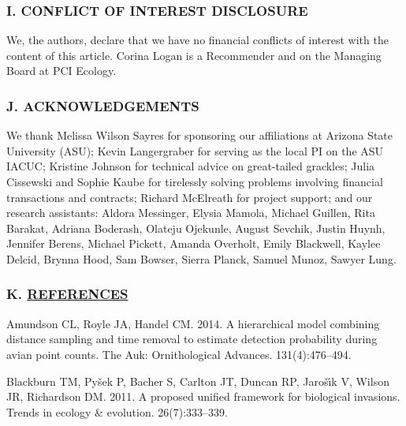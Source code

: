 \documentclass[
]{article}
\begin{document}
\hypertarget{i.-conflict-of-interest-disclosure}{%
\subsubsection{I. CONFLICT OF INTEREST
DISCLOSURE}\label{i.-conflict-of-interest-disclosure}}

We, the authors, declare that we have no financial conflicts of interest
with the content of this article. Corina Logan is a Recommender and on
the Managing Board at PCI Ecology.

\hypertarget{j.-acknowledgements}{%
\subsubsection{J. ACKNOWLEDGEMENTS}\label{j.-acknowledgements}}

We thank Melissa Wilson Sayres for sponsoring our affiliations at
Arizona State University (ASU); Kevin Langergraber for serving as the
local PI on the ASU IACUC; Kristine Johnson for technical advice on
great-tailed grackles; Julia Cissewski and Sophie Kaube for tirelessly
solving problems involving financial transactions and contracts; Richard
McElreath for project support; and our research assistants: Aldora
Messinger, Elysia Mamola, Michael Guillen, Rita Barakat, Adriana
Boderash, Olateju Ojekunle, August Sevchik, Justin Huynh, Jennifer
Berens, Michael Pickett, Amanda Overholt, Emily Blackwell, Kaylee
Delcid, Brynna Hood, Sam Bowser, Sierra Planck, Samuel Munoz, Sawyer
Lung.

\hypertarget{k.-references}{%
\subsubsection*{\texorpdfstring{K.
\href{MyLibrary.bib}{REFERENCES}}{K. REFERENCES}}\label{k.-references}}

\hypertarget{refs}{}
\leavevmode\hypertarget{ref-amundson2014hierarchical}{}%
Amundson CL, Royle JA, Handel CM. 2014. A hierarchical model combining
distance sampling and time removal to estimate detection probability
during avian point counts. The Auk: Ornithological Advances.
131(4):476--494.

\leavevmode\hypertarget{ref-blackburn2011proposed}{}%
Blackburn TM, Pyšek P, Bacher S, Carlton JT, Duncan RP, Jarošı́k V,
Wilson JR, Richardson DM. 2011. A proposed unified framework for
biological invasions. Trends in ecology \& evolution. 26(7):333--339.
\end{document}
